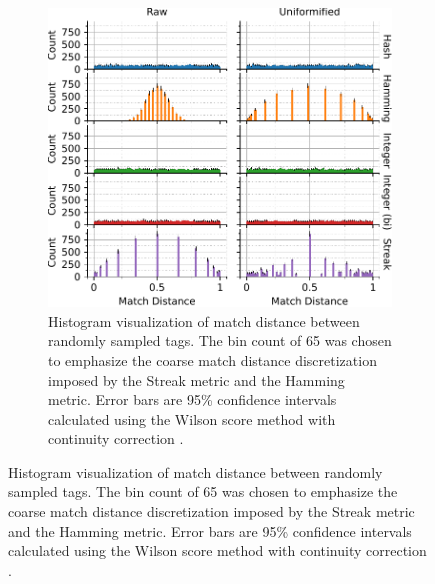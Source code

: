 \begin{figure}
\begin{center}

\begin{minipage}{\linewidth}
\begin{subfigure}[b]{\linewidth}
\begin{minipage}{0.75\textwidth}
\begin{center}
\includegraphics[width=\columnwidth]{img/uniformification/bitweight=0dot5+seed=1+title=low-score-distribution+viz=hist+_data_hathash_hash=75684cf1e73fb7f1+_script_fullcat_hash=dc969d47b9aa144d+ext=}
\end{center}
\end{minipage}
\begin{minipage}{0.23\textwidth}
\caption{
Histogram visualization of match distance between randomly sampled tags.
The bin count of 65 was chosen to emphasize the coarse match distance discretization imposed by the Streak metric and the Hamming metric.\footnotemark
Error bars are 95\% confidence intervals calculated using the Wilson score method with continuity correction \citep{newcombe1998two}.
}
\label{fig:uniformification_hist}
\end{minipage}
\end{subfigure}
\end{minipage}


\end{center}
\end{figure}
